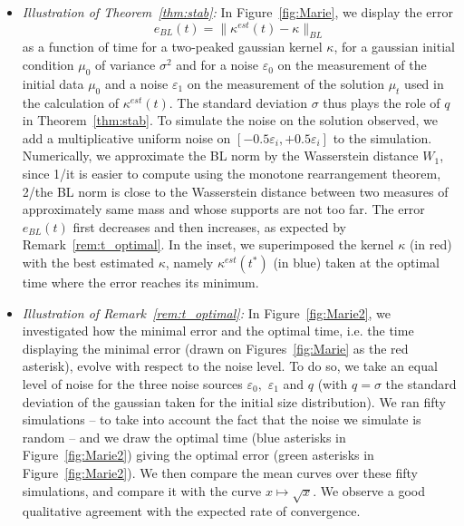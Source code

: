 \documentclass[10pt]{amsart}
\theoremstyle{definition}\newtheorem{defi}[theo]{Definition}\newtheorem{rema}[theo]{Remark}\newtheorem{exam}[theo]{Example}\newtheorem{exem}[theo]{Example}\newtheorem{nota}[theo]{Notation}
\newcommand*\eps{\varepsilon}
\begin{document}
\begin{itemize}
\noindent In Figure~\ref{fig:cor2:time1}, we display the shape of the estimated kernel $\kappa^{est}(t)$ for a small value of $t$, for a kernel $\kappa$ of erosion type and with three initial conditions being Gaussians with various spreading. It can be observed at the naked eye that the thinner the gaussian is, the better the approximation $\kappa^{est}(t)$ is as well. We observe how the estimated kernel $\kappa^{est}$ is differently impacted around $x=0$ and around $x=1$: this gives interesting hints on how the kernel symmetry could be used to improve the theoretical estimates.

\vspace*{4pt}
\item \emph{Illustration of Theorem~\ref{thm:stab}:\;} In Figure~\ref{fig:Marie}, we display the error
\[
e_{BL}(t)=\|\kappa^{est}(t)-\kappa\|_{BL}
\]
as a function of time for a two-peaked gaussian kernel $\kappa$, for a gaussian initial condition $\mu_0$ of variance $\sigma^2$ and for a noise $\eps_0$ on the measurement of the initial data $\mu_0$ and a noise $\eps_1$ on the measurement of the solution $\mu_t$ used in the calculation of $\kappa^{est}(t)$. The standard deviation $\sigma$ thus plays the role of $q$ in Theorem~\ref{thm:stab}. To simulate the noise on the solution observed, we add a multiplicative uniform noise on $[-0.5\varepsilon_i,+0.5\varepsilon_i]$ to the simulation.
Numerically, we approximate the BL norm by the Wasserstein distance $W_1$, since 1/it is easier to compute using the monotone rearrangement theorem, 2/the BL norm is close to the Wasserstein distance between two measures of approximately same mass and whose supports are not too far. The error $e_{BL}(t)$ first decreases and then increases, as expected by Remark~\ref{rem:t_optimal}. In the inset, we superimposed the kernel $\kappa$ (in red) with the best estimated $\kappa$, namely $\kappa^{est}(t^*)$ (in blue) taken at the optimal time where the error reaches its minimum.
\end{itemize}


\begin{itemize}
\item \emph{Illustration of Remark~\ref{rem:t_optimal}:\;} In Figure~\ref{fig:Marie2}, we investigated how the minimal error and the optimal time, i.e. the time displaying the minimal error (drawn on Figures~\ref{fig:Marie} as the red asterisk), evolve with respect to the noise level. To do so, we take an equal level of noise for the three noise sources $\eps_0,$ $\eps_1$ and $q$ (with $q=\sigma$ the standard deviation of the gaussian taken for the initial size distribution). We ran fifty simulations -- to take into account the fact that the noise we simulate is random -- and we draw the optimal time (blue asterisks in Figure~\ref{fig:Marie2}) giving the optimal error (green asterisks in Figure~\ref{fig:Marie2}). We then compare the mean curves over these fifty simulations, and compare it with the curve $x \mapsto \sqrt{x}$. We observe a good qualitative agreement with the expected rate of convergence.
\end{itemize}
\end{document}
